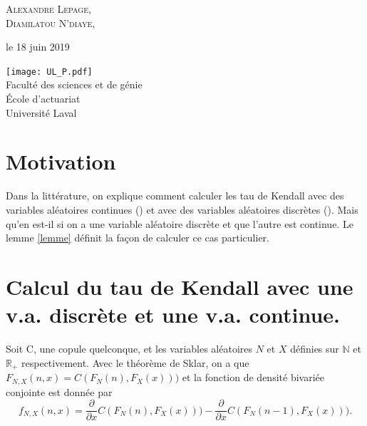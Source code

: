 \documentclass{article}
\begin{document}
\begin{titlepage}
		{\scshape\Large Alexandre Lepage, \\
			Diamilatou N'diaye, \\} %
		
		\vspace*{5\baselineskip}
		
		le 18 juin 2019
		
		\vspace{0.5\baselineskip} %
		
		\vfill %
		
		
		\texttt{[image: UL\_P.pdf]}\\
		
		Faculté des sciences et de génie\\
		École d'actuariat\\
		Université Laval\\     
	\end{titlepage}

	\setcounter{page}{0}
	
	\newpage
	\strut %
	\newpage
	
	\tableofcontents
	\newpage
	\renewcommand{\listfigurename}{Liste des illustrations}
	\listoffigures
	\newpage
	\listoftables
	\newpage
	
	\setcounter{page}{1}
	
	
	\section{Motivation}
	Dans la littérature, on explique comment calculer les tau de Kendall avec des variables aléatoires continues (\cite{Everything}) et avec des variables aléatoires discrètes (\cite{Nikoloulopoulos_Kendall_discret}). Mais qu'en est-il si on a une variable aléatoire discrète et que l'autre est continue. Le lemme \ref{lemme} définit la façon de calculer ce cas particulier.\\
	
	\section{Calcul du tau de Kendall avec une v.a. discrète et une v.a. continue.}
	Soit C, une copule quelconque, et les variables aléatoires $N$ et $X$ définies sur $\mathbb{N}$ et $\mathbb{R}_+$ respectivement.
	Avec le théorème de Sklar, on a que $F_{N,X}(n,x) = C(F_N(n), F_X(x)))$ et la fonction de densité bivariée conjointe est donnée par 
	\begin{equation*}
		f_{N,X}(n,x) =  \frac{\partial}{\partial x} C(F_N(n), F_X(x))) - \frac{\partial}{\partial x} C(F_N(n-1), F_X(x))).
	\end{equation*}
	
\end{document}
